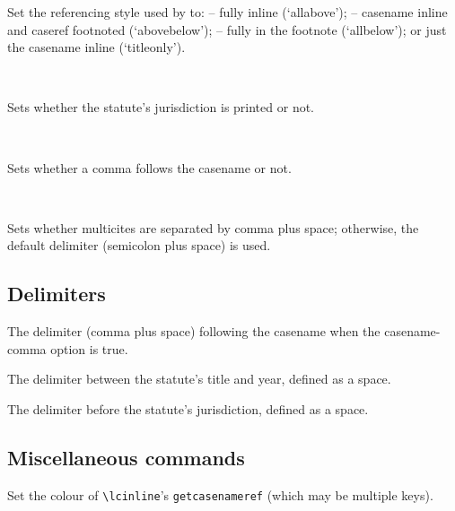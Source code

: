 Set the referencing style used by \texttt{} to: -- fully inline (`allabove'); -- casename inline and caseref footnoted (`abovebelow'); -- fully in the footnote (`allbelow'); or just the casename inline (`titleonly'). 
\bigskip
	
 \\

Sets whether the statute's jurisdiction is printed or not.
\bigskip


 \\

Sets whether a comma follows the casename or not.
\bigskip

 \\

Sets whether multicites are separated by comma plus space; otherwise, the default delimiter (semicolon plus space) is used.
\bigskip



\subsection{Delimiters}



The delimiter (comma plus space) following the casename when the casename-comma option is true.
\bigskip



The delimiter between the statute's title and year, defined as a space.
\bigskip


The delimiter before the statute's jurisdiction, defined as a space.



\subsection{Miscellaneous commands}



Set the colour of \texttt{\textbackslash lcinline}'s \colorbox{red!10}{\texttt{getcasenameref}} (which may be multiple keys).
\bigskip
	

